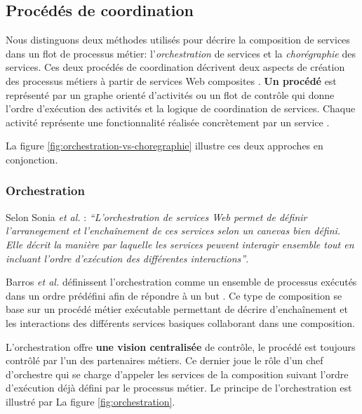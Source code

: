     \subsection{Procédés de coordination}
    \label{sec:proc-de-coord}
    Nous distinguons deux méthodes utilisés pour décrire la
    composition de services dans un flot de processus métier:
    l'\emph{orchestration} de services et la \emph{chorégraphie} des
    services. Ces deux procédés de coordination décrivent deux aspects
    de création des processus métiers à partir de services Web
    composites \cite{peltz2003web}.
    \textbf{Un procédé} est représenté par un graphe orienté
    d'activités ou un flot de contrôle qui donne l'ordre d'exécution
    des activités et la logique de coordination de services. Chaque
    activité représente une fonctionnalité réalisée concrètement par
    un service \cite{chollet2009orchestration}.

    La figure \ref{fig:orchestration-vs-choregraphie} illustre ces
    deux approches en conjonction.
           

      \subsubsection{Orchestration}
      \label{sec:orchestration-sec}
      Selon Sonia \emph{et al.} \cite{jamal2005environnement}:
      \emph{``L'orchestration de services Web permet de définir
        l'arranegement et l'enchaînement de ces services selon un
        canevas bien défini. Elle décrit la manière par laquelle les
        services peuvent interagir ensemble tout en incluant l'ordre
        d'exécution des différentes interactions''}.

      Barros \emph{et al.} \cite{barros2006standards} définissent
      l'orchestration comme un ensemble de processus exécutés dans un
      ordre prédéfini afin de répondre à un but
      \cite{lopez2008selection}. Ce type de composition se base sur un
      procédé métier exécutable permettant de décrire d'enchaînement
      et les interactions des différents services basiques collaborant
      dans une composition.
      
      L'orchestration offre \textbf{une vision centralisée} de
      contrôle, le procédé est toujours contrôlé par l'un des
      partenaires métiers. Ce dernier joue le rôle d'un chef
      d'orchestre qui se charge d'appeler les services de la
      composition suivant l'ordre d'exécution déjà défini par le
      processus métier. Le principe de l'orchestration est illustré
      par La figure \ref{fig:orchestration}.

